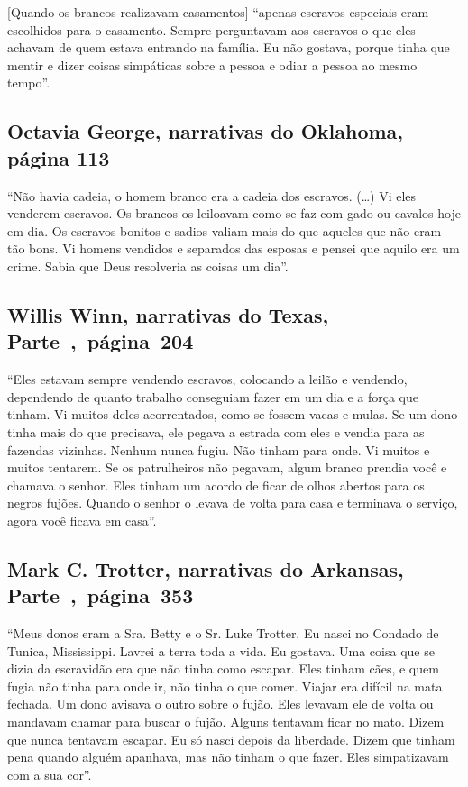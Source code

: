 {[}Quando os brancos realizavam casamentos{]} ``apenas escravos
especiais eram escolhidos para o casamento. Sempre perguntavam aos
escravos o que eles achavam de quem estava entrando na família. Eu não
gostava, porque tinha que mentir e dizer coisas simpáticas sobre a
pessoa e odiar a pessoa ao mesmo tempo''.

\subsection{Octavia George, narrativas do Oklahoma, página 113} \label{ref105}

``Não havia cadeia, o homem branco era a cadeia dos escravos. (\ldots{})
Vi eles venderem escravos. Os brancos os leiloavam como se faz com gado
ou cavalos hoje em dia. Os escravos bonitos e sadios valiam mais do que
aqueles que não eram tão bons. Vi homens vendidos e separados das
esposas e pensei que aquilo era um crime. Sabia que Deus resolveria as
coisas um dia''.

\subsection{Willis Winn, narrativas do Texas, Parte~,~página~204}
\label{ref304}

``Eles estavam sempre vendendo escravos, colocando a leilão e vendendo,
dependendo de quanto trabalho conseguiam fazer em um dia e a força que
tinham. Vi muitos deles acorrentados, como se fossem vacas e mulas. Se
um dono tinha mais do que precisava, ele pegava a estrada com eles e
vendia para as fazendas vizinhas. Nenhum nunca fugiu. Não tinham para
onde. Vi muitos e muitos tentarem. Se os patrulheiros não pegavam, algum
branco prendia você e chamava o senhor. Eles tinham um acordo de ficar
de olhos abertos para os negros fujões. Quando o senhor o levava de
volta para casa e terminava o serviço, agora você ficava em casa''.

\subsection{Mark C. Trotter, narrativas do Arkansas, Parte~,~página~353}
\label{ref264}

``Meus donos eram a Sra. Betty e o Sr. Luke Trotter. Eu nasci no Condado
de Tunica, Mississippi. Lavrei a terra toda a vida. Eu gostava. Uma
coisa que se dizia da escravidão era que não tinha como escapar. Eles
tinham cães, e quem fugia não tinha para onde ir, não tinha o que comer.
Viajar era difícil na mata fechada. Um dono avisava o outro sobre o
fujão. Eles levavam ele de volta ou mandavam chamar para buscar o fujão.
Alguns tentavam ficar no mato. Dizem que nunca tentavam escapar. Eu só
nasci depois da liberdade. Dizem que tinham pena quando alguém apanhava,
mas não tinham o que fazer. Eles simpatizavam com a sua cor''.

